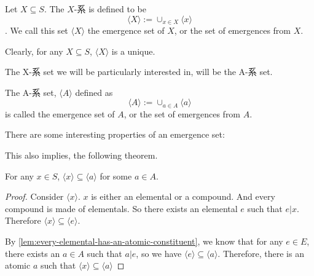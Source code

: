 \begin{definition}[X-系]\label{def:hais-of-sets}
        Let $X\subseteq S$. The $X$-系 is defined to be $$\langle X \rangle := \cup_{x\in X} \langle x \rangle$$. We call this set  $\langle X \rangle$ the emergence set of $X$, or the set of emergences from $X$.
\end{definition}

Clearly, for any $X\subseteq S$, $\langle X \rangle$ is a unique.

The X-系 set we will be particularly interested in, will be the A-系 set. 

\begin{axiom}\label{ax:the emergence-set-of-A}
    The A-系 set, $\langle A \rangle$ defined as
     $$\langle A \rangle := \cup_{a\in A} \langle a \rangle$$ 
     is called the emergence set of $A$, or the set of emergences from $A$. 
\end{axiom}


There are some interesting properties of an emergence set: 










This also implies, the following theorem. 
\begin{theorem}\label{thm:every-hai-set-is-a-subset-of-a-hai-set-whose-head-is-atomic}
    For any $x\in S$, $\langle x \rangle \subseteq \langle a \rangle$ for some $a\in A$.
\end{theorem}
\begin{proof}
    Consider $\langle x \rangle$. $x$ is either an elemental or a compound. And every compound is made of elementals. So there exists an elemental $e$ such that $e|x$. Therefore $\langle x \rangle \subseteq \langle e \rangle$. 
    
    By \ref{lem:every-elemental-has-an-atomic-constituent}, we know that for any $e \in E$, there exists an $a \in A$ such that $a|e$, so we have $\langle e \rangle \subseteq \langle a \rangle$. Therefore, there is an atomic $a$ such that $\langle x \rangle \subseteq \langle a \rangle$
    
\end{proof}



